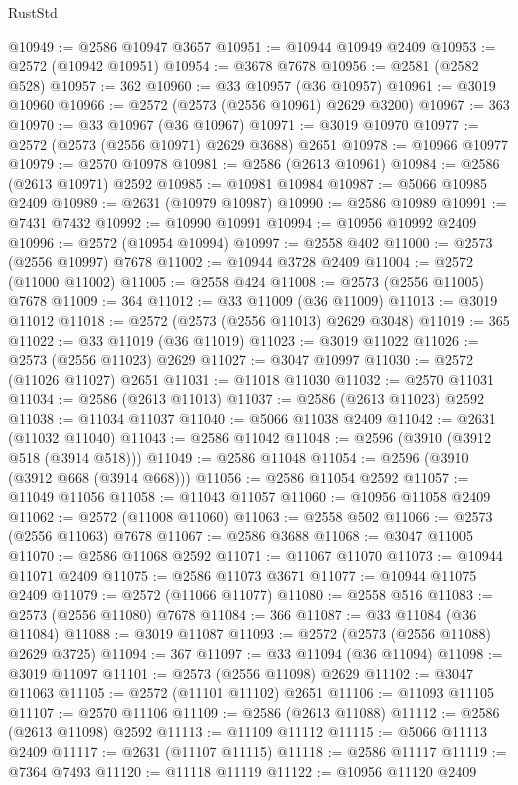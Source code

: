 \begin{lexlean}{RustStd}
\begin{coremodule}
@10949 := @2586 @10947 @3657
@10951 := @10944 @10949 @2409
@10953 := @2572 (@10942 @10951)
@10954 := @3678 @7678
@10956 := @2581 (@2582 @528)
@10957 := 362
@10960 := @33 @10957 (@36 @10957)
@10961 := @3019 @10960
@10966 := @2572 (@2573 (@2556 @10961) @2629 @3200)
@10967 := 363
@10970 := @33 @10967 (@36 @10967)
@10971 := @3019 @10970
@10977 := @2572 (@2573 (@2556 @10971) @2629 @3688) @2651
@10978 := @10966 @10977
@10979 := @2570 @10978
@10981 := @2586 (@2613 @10961)
@10984 := @2586 (@2613 @10971) @2592
@10985 := @10981 @10984
@10987 := @5066 @10985 @2409
@10989 := @2631 (@10979 @10987)
@10990 := @2586 @10989
@10991 := @7431 @7432
@10992 := @10990 @10991
@10994 := @10956 @10992 @2409
@10996 := @2572 (@10954 @10994)
@10997 := @2558 @402
@11000 := @2573 (@2556 @10997) @7678
@11002 := @10944 @3728 @2409
@11004 := @2572 (@11000 @11002)
@11005 := @2558 @424
@11008 := @2573 (@2556 @11005) @7678
@11009 := 364
@11012 := @33 @11009 (@36 @11009)
@11013 := @3019 @11012
@11018 := @2572 (@2573 (@2556 @11013) @2629 @3048)
@11019 := 365
@11022 := @33 @11019 (@36 @11019)
@11023 := @3019 @11022
@11026 := @2573 (@2556 @11023) @2629
@11027 := @3047 @10997
@11030 := @2572 (@11026 @11027) @2651
@11031 := @11018 @11030
@11032 := @2570 @11031
@11034 := @2586 (@2613 @11013)
@11037 := @2586 (@2613 @11023) @2592
@11038 := @11034 @11037
@11040 := @5066 @11038 @2409
@11042 := @2631 (@11032 @11040)
@11043 := @2586 @11042
@11048 := @2596 (@3910 (@3912 @518 (@3914 @518)))
@11049 := @2586 @11048
@11054 := @2596 (@3910 (@3912 @668 (@3914 @668)))
@11056 := @2586 @11054 @2592
@11057 := @11049 @11056
@11058 := @11043 @11057
@11060 := @10956 @11058 @2409
@11062 := @2572 (@11008 @11060)
@11063 := @2558 @502
@11066 := @2573 (@2556 @11063) @7678
@11067 := @2586 @3688
@11068 := @3047 @11005
@11070 := @2586 @11068 @2592
@11071 := @11067 @11070
@11073 := @10944 @11071 @2409
@11075 := @2586 @11073 @3671
@11077 := @10944 @11075 @2409
@11079 := @2572 (@11066 @11077)
@11080 := @2558 @516
@11083 := @2573 (@2556 @11080) @7678
@11084 := 366
@11087 := @33 @11084 (@36 @11084)
@11088 := @3019 @11087
@11093 := @2572 (@2573 (@2556 @11088) @2629 @3725)
@11094 := 367
@11097 := @33 @11094 (@36 @11094)
@11098 := @3019 @11097
@11101 := @2573 (@2556 @11098) @2629
@11102 := @3047 @11063
@11105 := @2572 (@11101 @11102) @2651
@11106 := @11093 @11105
@11107 := @2570 @11106
@11109 := @2586 (@2613 @11088)
@11112 := @2586 (@2613 @11098) @2592
@11113 := @11109 @11112
@11115 := @5066 @11113 @2409
@11117 := @2631 (@11107 @11115)
@11118 := @2586 @11117
@11119 := @7364 @7493
@11120 := @11118 @11119
@11122 := @10956 @11120 @2409

\end{coremodule}
\end{lexlean}
